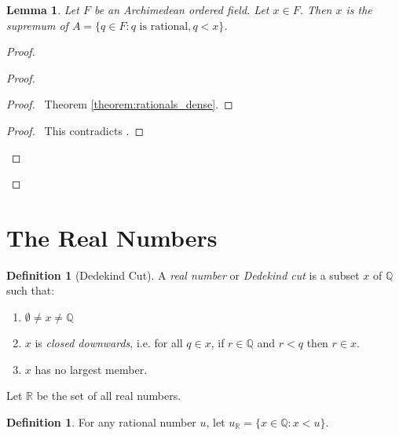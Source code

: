\documentclass{article}
\let\qed\relax
\newtheorem{lemma}[axiom]{Lemma}
\theoremstyle{definition}
\newtheorem{definition}[axiom]{Definition}
\begin{document}
    \begin{lemma}
        Let $F$ be an Archimedean ordered field. Let $x \in F$. Then $x$ is the supremum of
        $A = \{ q \in F : q \text{ is rational}, q < x \}$.
    \end{lemma}

    \begin{proof}
        \pf
        \begin{proof}
            \begin{proof}
                \pf\ Theorem \ref{theorem:rationals_dense}.
            \end{proof}
            \qedstep
            \begin{proof}
                \pf\ This contradicts .
            \end{proof}
        \end{proof}
        \qed
    \end{proof}
    
    \section{The Real Numbers}

    \begin{definition}[Dedekind Cut]
        A \emph{real number} or \emph{Dedekind cut} is a subset $x$ of $\mathbb{Q}$ such that:
        \begin{enumerate}
            \item $\emptyset \neq x \neq \mathbb{Q}$
            \item $x$ is \emph{closed downwards}, i.e. for all $q \in x$, if $r \in \mathbb{Q}$
            and $r < q$ then $r \in x$.
            \item $x$ has no largest member.
        \end{enumerate}
        Let $\mathbb{R}$ be the set of all real numbers.
    \end{definition}

    \begin{definition}
        For any rational number $u$, let $u_\mathbb{R} = \{ x \in \mathbb{Q} : x < u \}$.
    \end{definition}
\end{document}
